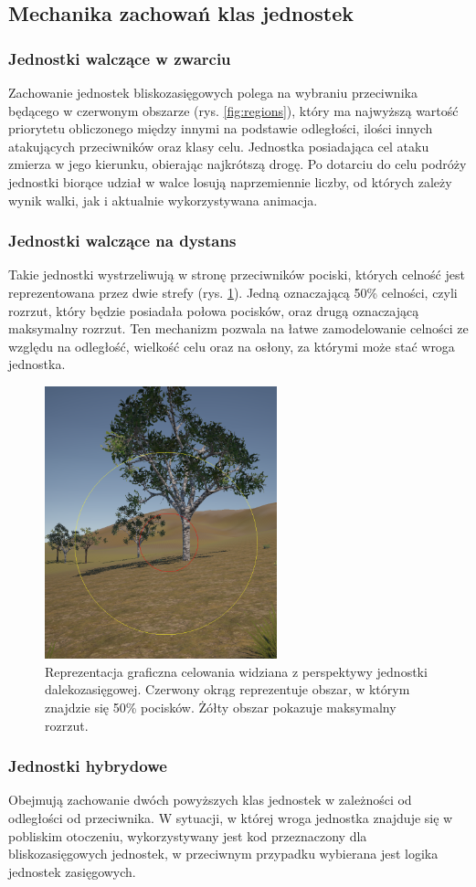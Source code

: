 \subsection{Mechanika zachowań klas jednostek}
\subsubsection{Jednostki walczące w zwarciu}
Zachowanie jednostek bliskozasięgowych polega na wybraniu przeciwnika będącego w czerwonym obszarze (rys. \ref{fig:regions}), który ma najwyższą
wartość priorytetu obliczonego między innymi na podstawie odległości, ilości innych atakujących przeciwników oraz klasy celu.
Jednostka posiadająca cel ataku zmierza w jego kierunku, obierając najkrótszą drogę. Po dotarciu do celu podróży jednostki biorące udział w walce
losują naprzemiennie liczby, od których zależy wynik walki, jak i aktualnie wykorzystywana animacja.

\subsubsection{Jednostki walczące na dystans}
Takie jednostki wystrzeliwują w stronę przeciwników pociski, których celność jest reprezentowana przez dwie strefy (rys. \ref{fig:acc2}). Jedną oznaczającą 50\% celności,
czyli rozrzut, który będzie posiadała połowa pocisków, oraz drugą oznaczającą maksymalny rozrzut. Ten mechanizm pozwala na łatwe zamodelowanie
celności ze względu na odległość, wielkość celu oraz na osłony, za którymi może stać wroga jednostka.
\begin{figure}[h]
\centering
\includegraphics[width=0.6\textwidth]{images/acc}
\caption{Reprezentacja graficzna celowania widziana z perspektywy jednostki dalekozasięgowej. Czerwony okrąg reprezentuje obszar, w którym znajdzie się 50\% pocisków. Żółty obszar pokazuje maksymalny rozrzut.}
\label{fig:acc2}
\end{figure}
\subsubsection{Jednostki hybrydowe}
Obejmują zachowanie dwóch powyższych klas jednostek w zależności od odległości od przeciwnika.
W sytuacji, w której wroga jednostka znajduje się w pobliskim otoczeniu, wykorzystywany jest kod przeznaczony dla bliskozasięgowych jednostek,
w przeciwnym przypadku wybierana jest logika jednostek zasięgowych.

